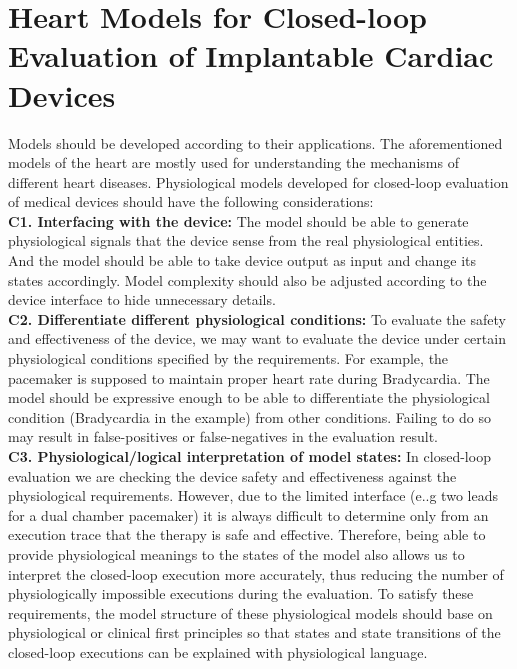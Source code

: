 \section{Heart Models for Closed-loop Evaluation of Implantable Cardiac Devices}
Models should be developed according to their applications. The aforementioned models of the heart are mostly used for understanding the mechanisms of different heart diseases. Physiological models developed for closed-loop evaluation of medical devices should have the following considerations:\\
\textbf{C1. Interfacing with the device: }The model should be able to generate physiological signals that the device sense from the real physiological entities. And the model should be able to take device output as input and change its states accordingly. Model complexity should also be adjusted according to the device interface to hide unnecessary details.\\
\textbf{C2. Differentiate different physiological conditions: }To evaluate the safety and effectiveness of the device, we may want to evaluate the device under certain physiological conditions specified by the requirements. For example, the pacemaker is supposed to maintain proper heart rate during Bradycardia. The model should be expressive enough to be able to differentiate the physiological condition (Bradycardia in the example) from other conditions. Failing to do so may result in false-positives or false-negatives in the evaluation result. \\
\textbf{C3. Physiological/logical interpretation of model states: } In closed-loop evaluation we are checking the device safety and effectiveness against the physiological requirements. However, due to the limited interface (e..g two leads for a dual chamber pacemaker) it is always difficult to determine only from an execution trace that the therapy is safe and effective. Therefore, being able to provide physiological meanings to the states of the model also allows us to interpret the closed-loop execution more accurately, thus reducing the number of physiologically impossible executions during the evaluation. To satisfy these requirements, the model structure of these physiological models should base on physiological or clinical first principles so that states and state transitions of the closed-loop executions can be explained with physiological language. \\%
